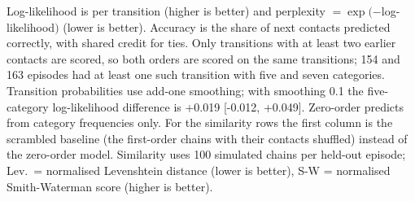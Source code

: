 \begin{table}[htbp]
\begin{minipage}{\linewidth}
Log-likelihood is per transition (higher is better) and perplexity $= \exp(-$log-likelihood$)$ (lower is better). Accuracy is the share of next contacts predicted correctly, with shared credit for ties. Only transitions with at least two earlier contacts are scored, so both orders are scored on the same transitions; 154 and 163 episodes had at least one such transition with five and seven categories. Transition probabilities use add-one smoothing; with smoothing 0.1 the five-category log-likelihood difference is +0.019 [-0.012, +0.049]. Zero-order predicts from category frequencies only. For the similarity rows the first column is the scrambled baseline (the first-order chains with their contacts shuffled) instead of the zero-order model. Similarity uses 100 simulated chains per held-out episode; Lev.\ = normalised Levenshtein distance (lower is better), S-W = normalised Smith-Waterman score (higher is better).
\end{minipage}
\end{table}
